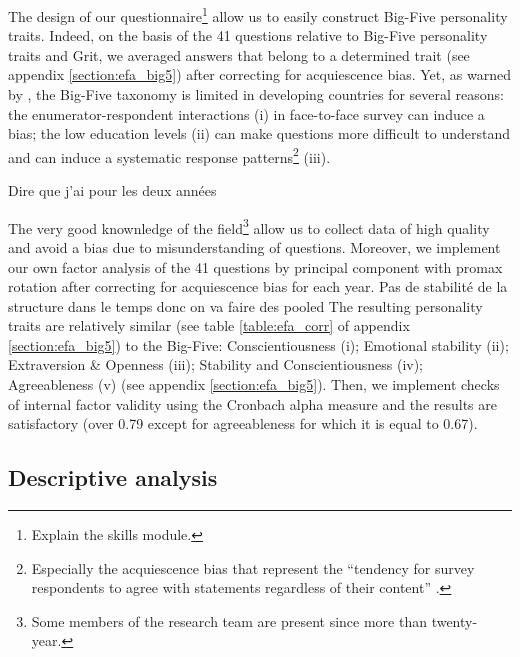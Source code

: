 \documentclass[a4paper, 11pt, onecolumn]{article}
\begin{document}
The design of our questionnaire\footnote{Explain the skills module.} allow us to easily construct Big-Five personality traits.
Indeed, on the basis of the 41 questions relative to Big-Five personality traits and Grit, we averaged answers that belong to a determined trait (see appendix \ref{section:efa_big5}) after correcting for acquiescence bias. 
Yet, as warned by \cite{Laajaj2019}, the Big-Five taxonomy is limited in developing countries for several reasons: the enumerator-respondent interactions (i) in face-to-face survey can induce a bias; the low education levels (ii) can make questions more difficult to understand and can induce a systematic response patterns\footnote{Especially the acquiescence bias that represent the ``tendency for survey respondents to agree with statements regardless of their content'' \citep{Lavrakas2008}.} (iii).

Dire que j'ai pour les deux années

The very good knownledge of the field\footnote{Some members of the research team are present since more than twenty-year.} allow us to collect data of high quality and avoid a bias due to misunderstanding of questions.
Moreover, we implement our own factor analysis of the 41 questions by principal component with promax rotation after correcting for acquiescence bias for each year.
Pas de stabilité de la structure dans le temps donc on va faire des pooled
The resulting personality traits are relatively similar (see table \ref{table:efa_corr} of appendix \ref{section:efa_big5}) to the Big-Five: Conscientiousness (i); Emotional stability (ii); Extraversion \& Openness (iii); Stability and Conscientiousness (iv); Agreeableness (v) (see appendix \ref{section:efa_big5}).
Then, we implement checks of internal factor validity using the Cronbach alpha measure and the results are satisfactory (over 0.79 except for agreeableness for which it is equal to 0.67).





	\subsection{Descriptive analysis}

\end{document}
